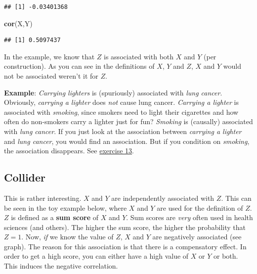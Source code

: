 \documentclass[
]{book}
\newenvironment{Shaded}{\begin{snugshade}}{\end{snugshade}}
\newcommand{\FunctionTok}[1]{\textcolor[rgb]{0.13,0.29,0.53}{\textbf{#1}}}
\newcommand{\NormalTok}[1]{#1}
\begin{document}
\begin{verbatim}
## [1] -0.03401368
\end{verbatim}

\begin{Shaded}
\begin{Highlighting}[]
\FunctionTok{cor}\NormalTok{(X,Y)}
\end{Highlighting}
\end{Shaded}

\begin{verbatim}
## [1] 0.5097437
\end{verbatim}

In the example, we know that \(Z\) is associated with both \(X\) and \(Y\) (per construction).
As you can see in the definitions of \(X\), \(Y\) and \(Z\), \(X\) and \(Y\) would not be associated
weren't it for \(Z\).

\textbf{Example}: \emph{Carrying lighters} is (spuriously) associated with \emph{lung cancer}. Obviously, \emph{carrying a lighter}
does \emph{not} cause lung cancer. \emph{Carrying a lighter} is associated with \emph{smoking}, since smokers need to light their
cigarettes and how often do non-smokers carry a lighter just for fun?
\emph{Smoking} is (causally) associated with \emph{lung cancer}. If you just look at the association between
\emph{carrying a lighter} and \emph{lung cancer}, you would find an association. But if you condition on \emph{smoking}, the association
disappears. See \hyperref[exercise13_multiple_regression]{exercise 13}.

\subsection{Collider}\label{collider}

This is rather interesting. \(X\) and \(Y\) are independently associated
with \(Z\). This can be seen in the toy example below, where \(X\) and \(Y\) are used
for the definition of \(Z\). \(Z\) is defined as a \textbf{sum
score} of \(X\) and \(Y\). Sum scores are \emph{very} often used in health sciences (and others).
The higher the sum score, the higher the probability that \(Z=1\).
Now, \emph{if} we know the value of \(Z\), \(X\) and \(Y\) are negatively associated (see graph).
The reason for this association is that there is a compensatory effect. In order to get a high
score, you can either have a high value of \(X\) or \(Y\) or both.
This induces the negative correlation.
\end{document}
